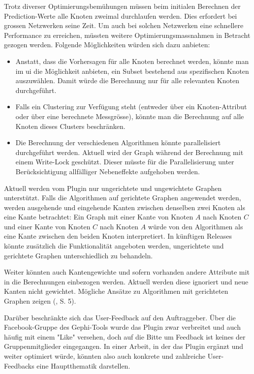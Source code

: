 Trotz diverser Optimierungsbemühungen müssen beim initialen Berechnen der Prediction-Werte alle Knoten zweimal durchlaufen werden.
Dies erfordert bei grossen Netzwerken seine Zeit.
Um auch bei solchen Netzwerken eine schnellere Performance zu erreichen, müssten weitere Optimierungsmassnahmen in Betracht gezogen werden.
Folgende Möglichkeiten würden sich dazu anbieten:

\begin{itemize}
    \item Anstatt, dass die Vorhersagen für alle Knoten berechnet werden, könnte man im \acs{ui} die Möglichkeit anbieten, ein Subset bestehend aus spezifischen Knoten auszuwählen. Damit würde die Berechnung nur für alle relevanten Knoten durchgeführt.
    \item Falls ein Clustering zur Verfügung steht (entweder über ein Knoten-Attribut oder über eine berechnete Messgrösse), könnte man die Berechnung auf alle Knoten dieses Clusters beschränken.
    \item Die Berechnung der verschiedenen Algorithmen könnte parallelisiert durchgeführt werden. Aktuell wird der Graph während der Berechnung mit einem Write-Lock geschützt. Dieser müsste für die Parallelisierung unter Berücksichtigung allfälliger Nebeneffekte aufgehoben werden.
\end{itemize}

Aktuell werden vom Plugin nur ungerichtete und ungewichtete Graphen unterstützt.
Falls die Algorithmen auf gerichtete Graphen angewendet werden, werden ausgehende und eingehende Kanten zwischen denselben zwei Knoten als eine Kante betrachtet:
Ein Graph mit einer Kante von Knoten $A$ nach Knoten $C$ und einer Kante von Knoten $C$ nach Knoten $A$ würde von den Algorithmen als eine Kante zwischen den beiden Knoten interpretiert.
In künftigen Releases könnte zusätzlich die Funktionalität angeboten werden, ungerichtete und gerichtete Graphen unterschiedlich zu behandeln.

Weiter könnten auch Kantengewichte und sofern vorhanden andere Attribute mit in die Berechnungen einbezogen werden.
Aktuell werden diese ignoriert und neue Kanten nicht gewichtet. Mögliche Ansätze zu Algorithmen mit gerichteten Graphen zeigen \citeauthor{gasulla_pdf_2014} (\citeyear{gasulla_pdf_2014}, S. 5).

Darüber beschränkte sich das User-Feedback auf den Auftraggeber.
Über die Facebook-Gruppe des Gephi-Tools wurde das Plugin zwar verbreitet und auch häufig mit einem "Like" versehen, doch auf die Bitte um Feedback ist keines der Gruppenmitglieder eingegangen.
In einer Arbeit, in der das Plugin ergänzt und weiter optimiert würde, könnten also auch konkrete und zahlreiche User-Feedbacks eine Hauptthematik darstellen.
